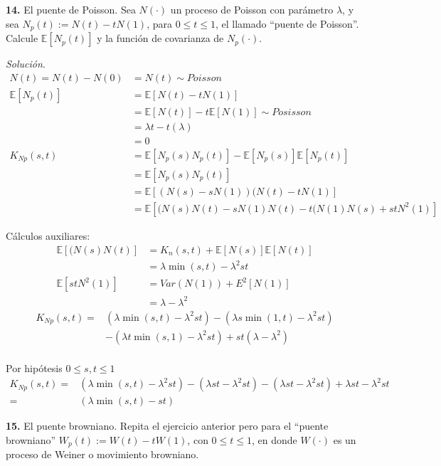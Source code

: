 \documentclass[12pt]{article}
\newcommand{\E}{\mathbb{E}}
\begin{document}
\begin{tcolorbox}[colback=blue!5!white, colframe=blue!5!white, arc=0mm, boxrule=0pt]
    \textbf{14.} El puente de Poisson. Sea $N(\cdot)$ un proceso de Poisson con parámetro $\lambda$, y sea $N_p(t) := N(t) - tN(1)$, para $0 \leq t \leq 1$, el llamado ``puente de Poisson''. Calcule $\E[N_p(t)]$ y la función de covarianza de $N_p (\cdot)$.
\end{tcolorbox} 

\textit{Solución}.
\begin{align*}
    N(t) = N(t) - N(0) &= N(t) \sim Poisson\\
    \E[N_p(t)] &= \E[N(t) - tN(1)]\\
    &= \E[N(t)] - t\E[N(1)] \sim Posisson\\
    &= \lambda t - t(\lambda) \\
    &= 0\\
    K_{Np}(s,t) &= \E[N_p(s) N_p(t)] - \E[N_p(s)]\E[N_p(t)]\\
    &= \E [N_p(s) N_p(t)] \\
    &= \E [(N(s)-sN(1))(N(t)-tN(1)]\\
    &= \E [(N(s)N(t)-sN(1)N(t)-t(N(1)N(s)+stN^{2}(1)]
\end{align*}    

Cálculos auxiliares:
\begin{align*}
\E [(N(s)N(t)] &= K_n(s,t) + \E[N(s)]\E[N(t)]\\
&= \lambda \min(s,t) - \lambda^{2}st\\
\E[stN^{2}(1)] &= Var(N(1)) + E^{2}[N(1)]\\
&= \lambda - \lambda^{2}
\end{align*}
\begin{align*}
K_{Np}(s,t) =  & (\lambda \min(s,t) -\lambda^{2}st)- (\lambda s \min(1,t) -\lambda^{2}st) \\
&- (\lambda t\min(s,1) -\lambda^{2}st) + st(\lambda - \lambda^{2})\\
\end{align*}

Por hipótesis $0 \leq s, t \leq 1$
\begin{align*}
K_{Np}(s,t) =&  (\lambda \min(s,t) -\lambda^{2}st)- (\lambda st - \lambda^{2}st) - (\lambda st -\lambda^{2}st) + \lambda st - \lambda^{2}st\\
=& (\lambda \min(s,t) - st)
\end{align*}

\begin{tcolorbox}[colback=blue!5!white, colframe=blue!5!white, arc=0mm, boxrule=0pt]
    \textbf{15.} El puente browniano. Repita el ejercicio anterior pero para el ``puente browniano'' $W_p(t) := W(t) - tW(1) $, con $0 \leq t \leq 1$, en donde $W(\cdot)$ es un proceso de Weiner o movimiento browniano.
\end{tcolorbox} 
\end{document}
